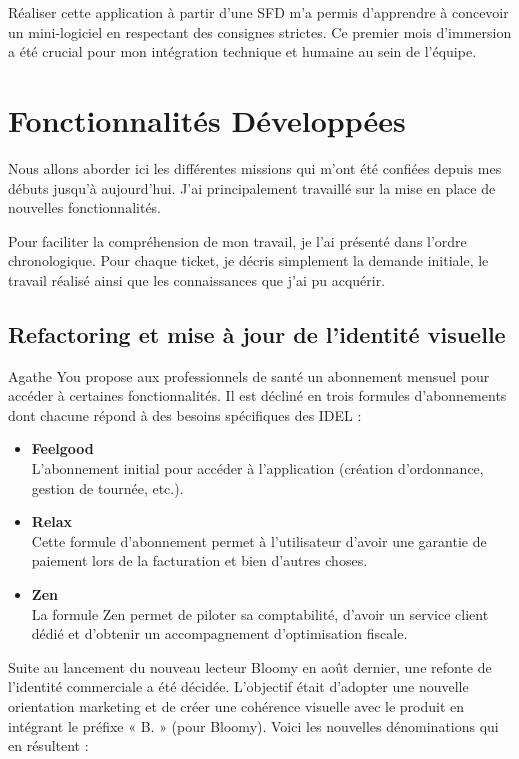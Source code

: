 \documentclass{article}
\begin{document}
Réaliser cette application à partir d'une SFD m'a permis d'apprendre à concevoir un mini-logiciel en respectant des consignes strictes. Ce premier mois d'immersion a été crucial pour mon intégration technique et humaine au sein de l'équipe.

\section{Fonctionnalités Développées}

Nous allons aborder ici les différentes missions qui m'ont été confiées depuis mes débuts jusqu'à aujourd'hui. J'ai principalement travaillé sur la mise en place de nouvelles fonctionnalités.

Pour faciliter la compréhension de mon travail, je l'ai présenté dans l'ordre chronologique. Pour chaque ticket, je décris simplement la demande initiale, le travail réalisé ainsi que les connaissances que j'ai pu acquérir.

\subsection{Refactoring et mise à jour de l'identité visuelle}

Agathe You propose aux professionnels de santé un abonnement mensuel pour accéder à certaines fonctionnalités. Il est décliné en trois formules d'abonnements dont chacune répond à des besoins spécifiques des IDEL :

\begin{itemize}
    \item \textbf{Feelgood} \\
    L'abonnement initial pour accéder à l'application (création d'ordonnance, gestion de tournée, etc.).

    \item \textbf{Relax} \\
    Cette formule d'abonnement permet à l'utilisateur d'avoir une garantie de paiement lors de la facturation et bien d'autres choses.

    \item \textbf{Zen} \\
    La formule Zen permet de piloter sa comptabilité, d'avoir un service client dédié et d'obtenir un accompagnement d'optimisation fiscale.
\end{itemize}

Suite au lancement du nouveau lecteur Bloomy en août dernier, une refonte de l'identité commerciale a été décidée. L'objectif était d'adopter une nouvelle orientation marketing et de créer une cohérence visuelle avec le produit en intégrant le préfixe « B. » (pour Bloomy). Voici les nouvelles dénominations qui en résultent :
\end{document}
